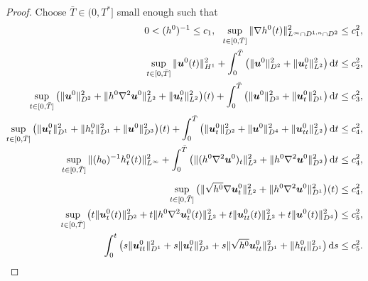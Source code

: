\documentclass[11pt,reqno]{amsart}
\numberwithin{rk}{section}
\numberwithin{prop}{section}
\numberwithin{mydef}{section}
\numberwithin{lem}{section}
\numberwithin{equation}{section}
\numberwithin{thm}{section}
\begin{document}
\begin{proof}
Choose $\bar{T}\in (0,T^*]$ small enough such that
\begin{align}
\begin{aligned}
0<(h^0)^{-1}\leq c_1,\ \
\sup_{t\in[0,\bar{T}]}\|\nabla h^0(t)\|^2_{L^\infty\cap D^{1,n}\cap D^2}&\leq c^2_1,\notag\\
\sup_{t\in[0,\bar{T}]}\|\boldsymbol{u}^0(t)\|^2_{H^1}
+\int^{\bar{T}}_0\big(\|\boldsymbol{u}^0\|^2_{D^2}+\|\boldsymbol{u}^0_t\|^2_{L^2}\big)\,\mathrm{d}t&\leq c_2^2,\notag
\end{aligned}\\
\begin{aligned}\label{it0}
\sup_{t\in[0,\bar{T}]}\big(\|\boldsymbol{u}^0\|_{D^2}^2+\|h^0\nabla^2\boldsymbol{u}^0\|^2_{L^2}+\|\boldsymbol{u}^0_t\|^2_{L^2}\big)(t)
+\int^{\bar{T}}_0\big(\|\boldsymbol{u}^0\|^2_{D^3}+\|\boldsymbol{u}^0_t\|^2_{D^1}\big)\,\mathrm{d}t\leq c_3^2,\\
\sup_{t\in[0,\bar{T}]}\big(\|\boldsymbol{u}^0_t\|^2_{D^1}+\|h^0_t\|^2_{D^1}+\|\boldsymbol{u}^0\|^2_{D^3}\big)(t)
+\int^{\bar{T}}_0\big(\|\boldsymbol{u}^0_t\|^2_{D^2}+\|\boldsymbol{u}^0\|^2_{D^4}+\|\boldsymbol{u}^0_{tt}\|^2_{L^2}\big)\,\mathrm{d}t
\leq c_4^2,\\[-2pt]
\sup_{t\in[0,\bar{T}]}\|(h_0)^{-1}h^0_t(t)\|^2_{L^{\infty}}
+\int^{\bar{T}}_0\big(\|(h^0\nabla^2\boldsymbol{u}^0)_t\|^2_{L^2}+\|h^0\nabla^2\boldsymbol{u}^0\|^2_{D^2}\big)\,\mathrm{d}t\leq c_4^2,\\[4pt]
\sup_{t\in[0,\bar{T}]}\big(\|\sqrt{h^0}\nabla \boldsymbol{u}^0_t\|^2_{L^2}+\|h^0\nabla^2\boldsymbol{u}^0\|^2_{D^1}\big)(t)\leq c^2_4,
\end{aligned}\\[1pt]
\begin{aligned} 
\sup_{t\in[0,\bar{T}]}\big(t\|\boldsymbol{u}^0_t(t)\|^2_{D^2}+t\|h^0\nabla^2\boldsymbol{u}^0_t(t)\|^2_{L^2}+t\|\boldsymbol{u}^0_{tt}(t)\|^2_{L^2}+t\|\boldsymbol{u}^0(t)\|^2_{D^4}\big)\leq  c_5^2,\\
\int^t_0\big(s\|\boldsymbol{u}^0_{tt}\|_{D^1}^2+s\|\boldsymbol{u}^0_t\|^2_{D^3}+s\|\sqrt{h^0} \boldsymbol{u}^0_{tt}\|_{D^1}^2+\|h^0_{tt}\|^2_{D^1}\big)\,\mathrm{d}s\leq  c_5^2.\notag
\end{aligned}
\end{align}
 



\end{proof}
\end{document}
